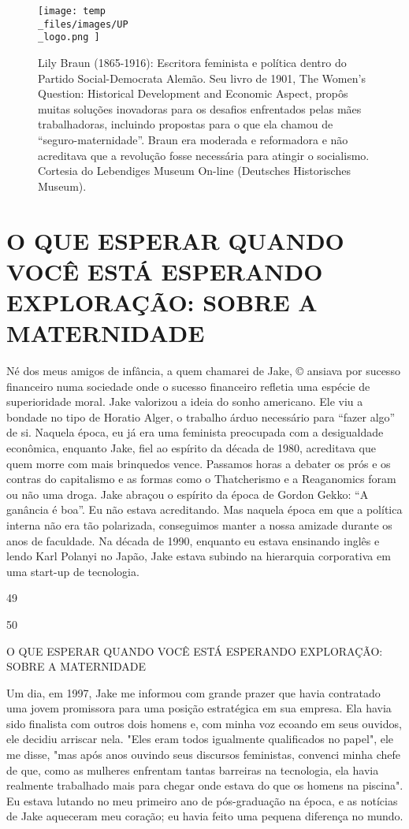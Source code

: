 \begin{figure}
	\centering
	\texttt{[image: temp\\\_files/images/UP\\\_logo.png ]}
	\caption{Lily Braun (1865-1916): Escritora feminista e política dentro do Partido Social-Democrata Alemão. Seu livro de 1901, The Women’s Question: Historical Development and Economic Aspect, propôs muitas soluções inovadoras para os desafios enfrentados pelas mães trabalhadoras, incluindo propostas para o que ela chamou de “seguro-maternidade”. Braun era moderada e reformadora e não acreditava que a revolução fosse necessária para atingir o socialismo. Cortesia do Lebendiges Museum On-line (Deutsches Historisches Museum).}
	\label{ }
\end{figure}
 \par 
\chapter{O QUE ESPERAR QUANDO VOCÊ ESTÁ ESPERANDO EXPLORAÇÃO: SOBRE A MATERNIDADE}\label{O QUE ESPERAR QUANDO VOCÊ ESTÁ ESPERANDO EXPLORAÇÃO: SOBRE A MATERNIDADE}
 \par 
Né dos meus amigos de infância, a quem chamarei de Jake, © ansiava por sucesso financeiro numa sociedade onde o sucesso financeiro refletia uma espécie de superioridade moral. Jake valorizou a ideia do sonho americano. Ele viu a bondade no tipo de Horatio Alger, o trabalho árduo necessário para “fazer algo” de si. Naquela época, eu já era uma feminista preocupada com a desigualdade econômica, enquanto Jake, fiel ao espírito da década de 1980, acreditava que quem morre com mais brinquedos vence. Passamos horas a debater os prós e os contras do capitalismo e as formas como o Thatcherismo e a Reaganomics foram ou não uma droga. Jake abraçou o espírito da época de Gordon Gekko: “A ganância é boa”. Eu não estava acreditando. Mas naquela época em que a política interna não era tão polarizada, conseguimos manter a nossa amizade durante os anos de faculdade. Na década de 1990, enquanto eu estava ensinando inglês e lendo Karl Polanyi no Japão, Jake estava subindo na hierarquia corporativa em uma start-up de tecnologia.
 \par 
49
 \par 
50
 \par 
O QUE ESPERAR QUANDO VOCÊ ESTÁ ESPERANDO EXPLORAÇÃO: SOBRE A MATERNIDADE
 \par 
Um dia, em 1997, Jake me informou com grande prazer que havia contratado uma jovem promissora para uma posição estratégica em sua empresa. Ela havia sido finalista com outros dois homens e, com minha voz ecoando em seus ouvidos, ele decidiu arriscar nela. "Eles eram todos igualmente qualificados no papel", ele me disse, "mas após anos ouvindo seus discursos feministas, convenci minha chefe de que, como as mulheres enfrentam tantas barreiras na tecnologia, ela havia realmente trabalhado mais para chegar onde estava do que os homens na piscina". Eu estava lutando no meu primeiro ano de pós-graduação na época, e as notícias de Jake aqueceram meu coração; eu havia feito uma pequena diferença no mundo.
